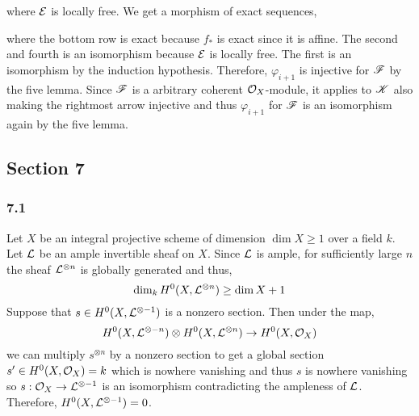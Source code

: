 \documentclass[12pt]{article}
\begin{document}
\begin{enumerate}
\begin{center}
\end{center}
where $\mathcal{E}$ is locally free. We get a morphism of exact sequences,
\begin{center}
\end{center}
where the bottom row is exact because $f_*$ is exact since it is affine. The second and fourth is an isomorphism because $\mathcal{E}$ is locally free. The first is an isomorphism by the induction hypothesis. Therefore, $\varphi_{i+1}$ is injective for $\mathscr{F}$ by the five lemma. Since $\mathscr{F}$ is a arbitrary coherent $\mathcal{O}_{X}$-module, it applies to $\mathscr{K}$ also making the rightmost arrow injective and thus $\varphi_{i+1}$ for $\mathscr{F}$ is an isomorphism again by the five lemma.
\end{enumerate}

\subsection{Section 7}

\subsubsection{7.1}

Let $X$ be an integral projective scheme of dimension $\dim{X} \ge 1$ over a field $k$. Let $\mathcal{L}$ be an ample invertible sheaf on $X$. Since $\mathcal{L}$ is ample, for sufficiently large $n$ the sheaf $\mathcal{L}^{\otimes n}$ is globally generated and thus,
\[ \dim_k H^0(X, \mathcal{L}^{\otimes n}) \ge \dim{X} + 1 \]
Suppose that $s \in H^0(X, \mathcal{L}^{\otimes -1})$ is a nonzero section. Then under the map,
\[ H^0(X, \mathcal{L}^{\otimes -n}) \otimes H^0(X, \mathcal{L}^{\otimes n}) \to H^0(X, \mathcal{O}_{X}) \]
we can multiply $s^{\otimes n}$ by a nonzero section to get a global section $s' \in H^0(X, \mathcal{O}_{X}) = k$ which is nowhere vanishing and thus $s$ is nowhere vanishing so $s : \mathcal{O}_{X} \to \mathcal{L}^{\otimes -1}$ is an isomorphism contradicting the ampleness of $\mathcal{L}$. Therefore, $H^0(X, \mathcal{L}^{\otimes -1}) = 0$.  
\end{document}
